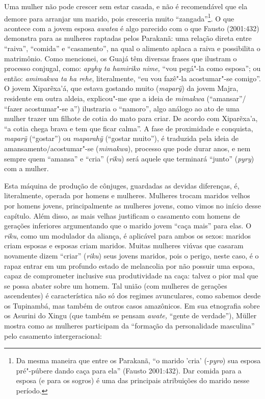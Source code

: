 Uma mulher não pode crescer sem estar casada, e não é recomendável que
ela demore para arranjar um marido, pois cresceria muito
``zangada''\footnote{Da mesma maneira que entre os Parakanã, ``o marido
  'cria' (-\emph{pyro}) sua esposa pré"-púbere dando caça para ela''
  (Fausto 2001:432). Dar comida para a esposa (e para os sogros) é uma
  das principais atribuições do marido nesse período.}. O que acontece
com a jovem esposa \emph{awatea} é algo parecido com o que Fausto
(2001:432) demonstra para as mulheres raptadas pelos Parakanã: uma
relação direta entre ``raiva'', ``comida'' e ``casamento'', na qual o
alimento aplaca a raiva e possibilita o matrimônio. Como mencionei, os
Guajá têm diversas frases que ilustram o processo conjugal, como:
\emph{apyhy ta hamiriko nime,} ``vou pegá"-la como esposa''; ou então:
\emph{amimakwa ta ha rehe}, literalmente, ``eu vou fazê"-la acostumar"-se
comigo''. O jovem Xiparẽxa'á, que estava gostando muito (\emph{maparỹ})
da jovem Majra, residente em outra aldeia, explicou"-me que a ideia de
\emph{mimakwa} (``amansar''/ ``fazer acostumar"-se a'') ilustraria o
``namoro'', algo análogo ao ato de uma mulher trazer um filhote de cotia
do mato para criar. De acordo com Xiparẽxa'a, ``a cotia chega brava e tem
que ficar calma''. A fase de proximidade e conquista, \emph{maparỹ}
(``gostar'') ou \emph{maparahỹ} (``gostar muito''), é traduzida pela ideia
de amansamento/acostumar"-se (\emph{mimakwa}), processo que pode durar
anos, e nem sempre quem ``amansa'' e ``cria'' (\emph{riku}) será aquele que
terminará ``junto'' (\emph{pyry}) com a mulher.

Esta máquina de produção de cônjuges, guardadas as devidas diferenças,
é, literalmente, operada por homens e mulheres. Mulheres trocam maridos
velhos por homens jovens, principalmente as mulheres jovens, como vimos
no início desse capítulo. Além disso, as mais velhas justificam o
casamento com homens de gerações inferiores argumentando que o marido
jovem ``caça mais'' para elas. O \emph{riku}, como um modulador da
aliança, é aplicável para ambos os sexos: maridos criam esposas e
esposas criam maridos. Muitas mulheres viúvas que casaram novamente
dizem ``criar'' (\emph{riku}) seus jovens maridos, pois o perigo, neste
caso, é o rapaz entrar em um profundo estado de melancolia por não
possuir uma esposa, capaz de comprometer inclusive sua produtividade na
caça: talvez o pior mal que se possa abater sobre um homem. Tal união
(com mulheres de gerações ascendentes) é característica não só dos
regimes avunculares, como sabemos desde os Tupinambá, mas também de
outros casos amazônicos. Em sua etnografia sobre os Asurini do Xingu
(que também se pensam \emph{awate,} ``gente de verdade''), Müller mostra
como as mulheres participam da ``formação da personalidade masculina''
pelo casamento intergeracional:

